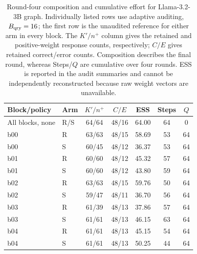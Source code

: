 \begin{table}[H]
\caption{Round-four composition and cumulative effort for Llama-3.2-3B graph. Individually listed rows use adaptive auditing, $B_{\rm qry}=16$; the first row is the unaudited reference for either arm in every block. The $K'/n^+$ column gives the retained and positive-weight response counts, respectively; $C/E$ gives retained correct/error counts. Composition describes the final round, whereas Steps/$Q$ are cumulative over four rounds. ESS is reported in the audit summaries and cannot be independently reconstructed because raw weight vectors are unavailable.}
\label{tab:audit-composition}
\centering\small\setlength{\tabcolsep}{6pt}
\begin{tabular}{@{}llccccc@{}}
\toprule
Block/policy & Arm & $K'/n^+$ & $C/E$ & ESS & Steps & $Q$\\
\midrule
All blocks, none & R/S & 64/64 & 48/16 & 64.00 & 64 & 0\\
\midrule
b00 & R & 63/63 & 48/15 & 58.69 & 53 & 64\\
b00 & S & 60/45 & 48/12 & 36.37 & 53 & 64\\
b01 & R & 60/60 & 48/12 & 45.32 & 57 & 64\\
b01 & S & 60/60 & 48/12 & 43.80 & 59 & 64\\
b02 & R & 63/63 & 48/15 & 59.76 & 50 & 64\\
b02 & S & 59/47 & 48/11 & 36.70 & 56 & 64\\
b03 & R & 61/39 & 48/13 & 37.86 & 57 & 64\\
b03 & S & 61/61 & 48/13 & 46.15 & 63 & 64\\
b04 & R & 61/61 & 48/13 & 45.15 & 54 & 64\\
b04 & S & 61/61 & 48/13 & 50.25 & 44 & 64\\
\bottomrule
\end{tabular}
\end{table}
